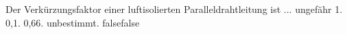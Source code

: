     {Der Verkürzungsfaktor einer luftisolierten Paralleldrahtleitung ist ...}
    {ungefähr 1.}
    {0,1.}
    {0,66.}
    {unbestimmt.}
    {false}{false}